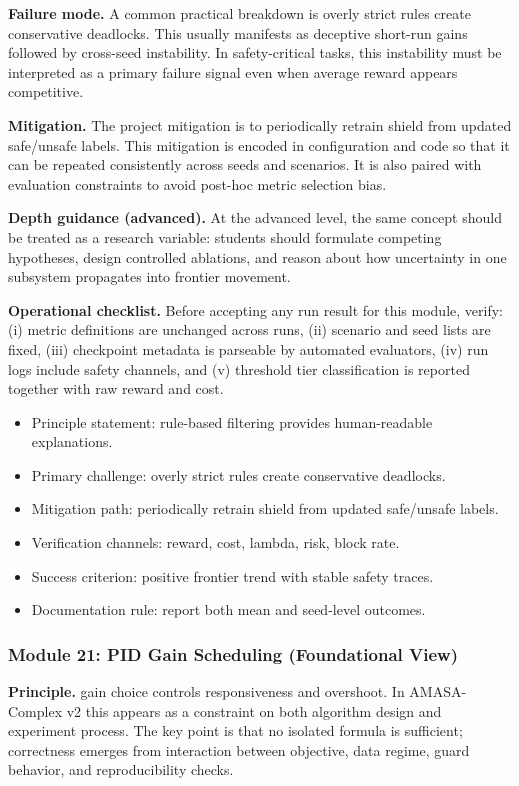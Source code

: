 \documentclass[conference]{IEEEtran}
\begin{document}
\textbf{Failure mode.} A common practical breakdown is overly strict rules create conservative deadlocks. This usually manifests as deceptive short-run gains followed by cross-seed instability. In safety-critical tasks, this instability must be interpreted as a primary failure signal even when average reward appears competitive.

\textbf{Mitigation.} The project mitigation is to periodically retrain shield from updated safe/unsafe labels. This mitigation is encoded in configuration and code so that it can be repeated consistently across seeds and scenarios. It is also paired with evaluation constraints to avoid post-hoc metric selection bias.

\textbf{Depth guidance (advanced).} At the advanced level, the same concept should be treated as a research variable: students should formulate competing hypotheses, design controlled ablations, and reason about how uncertainty in one subsystem propagates into frontier movement.

\textbf{Operational checklist.} Before accepting any run result for this module, verify: (i) metric definitions are unchanged across runs, (ii) scenario and seed lists are fixed, (iii) checkpoint metadata is parseable by automated evaluators, (iv) run logs include safety channels, and (v) threshold tier classification is reported together with raw reward and cost.

\begin{itemize}[leftmargin=*]
  \item Principle statement: rule-based filtering provides human-readable explanations.
  \item Primary challenge: overly strict rules create conservative deadlocks.
  \item Mitigation path: periodically retrain shield from updated safe/unsafe labels.
  \item Verification channels: reward, cost, lambda, risk, block rate.
  \item Success criterion: positive frontier trend with stable safety traces.
  \item Documentation rule: report both mean and seed-level outcomes.
\end{itemize}


\subsubsection{Module 21: PID Gain Scheduling (Foundational View)}
\textbf{Principle.} gain choice controls responsiveness and overshoot. In AMASA-Complex v2 this appears as a constraint on both algorithm design and experiment process. The key point is that no isolated formula is sufficient; correctness emerges from interaction between objective, data regime, guard behavior, and reproducibility checks.
\end{document}
